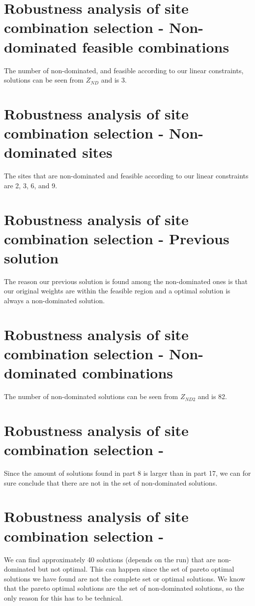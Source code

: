 \documentclass{article}
\begin{document}
\section{Robustness analysis of site combination selection - Non-dominated feasible combinations}
The number of non-dominated, and feasible according to our linear constraints, solutions can be seen from $Z_{ND}$ and is 3.
\section{Robustness analysis of site combination selection - Non-dominated sites}
The sites that are non-dominated and feasible according to our linear constraints are 2, 3, 6, and 9. 
\section{Robustness analysis of site combination selection - Previous solution}
The reason our previous solution is found among the non-dominated ones is that our original weights are within the feasible region and a optimal solution is always a non-dominated solution. 
\section{Robustness analysis of site combination selection - Non-dominated combinations}
The number of non-dominated solutions can be seen from $Z_{ND2}$ and is 82.
\section{Robustness analysis of site combination selection - }
Since the amount of solutions found in part 8 is larger than in part 17, we can for sure conclude that there are not in the set of non-dominated solutions. 

\section{Robustness analysis of site combination selection - }
We can find approximately 40 solutions (depends on the run) that are non-dominated but not optimal. This can happen since the set of pareto optimal solutions we have found are not the complete set or optimal solutions. We know that the pareto optimal solutions are the set of non-dominated solutions, so the only reason for this has to be technical.  
\end{document}
